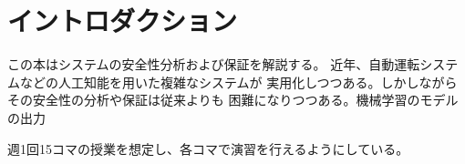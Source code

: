 \chapter{イントロダクション}
\label{chap1}

この本はシステムの安全性分析および保証を解説する。
近年、自動運転システムなどの人工知能を用いた複雑なシステムが
実用化しつつある。しかしながらその安全性の分析や保証は従来よりも
困難になりつつある。機械学習のモデルの出力

週1回15コマの授業を想定し、各コマで演習を行えるようにしている。